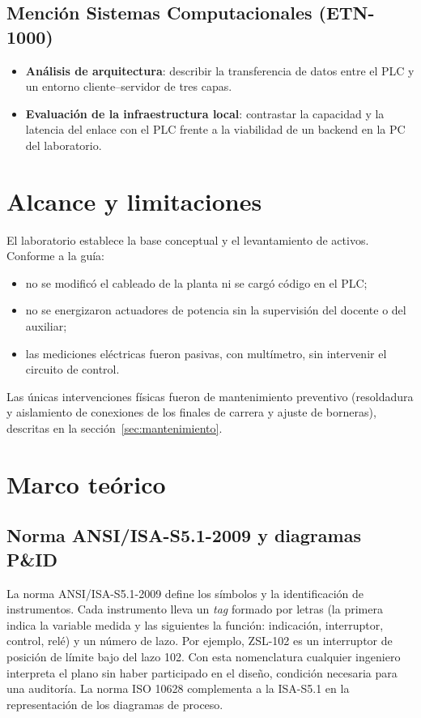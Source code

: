\documentclass[a4paper,11pt]{article}
\begin{document}
\subsection{Mención Sistemas Computacionales (ETN-1000)}
\begin{itemize}
\item \textbf{Análisis de arquitectura}: describir la transferencia de datos entre el PLC y un entorno cliente--servidor de tres capas.
\item \textbf{Evaluación de la infraestructura local}: contrastar la capacidad y la latencia del enlace con el PLC frente a la viabilidad de un backend en la PC del laboratorio.
\end{itemize}

\section{Alcance y limitaciones}
El laboratorio establece la base conceptual y el levantamiento de activos. Conforme a la guía:
\begin{itemize}
\item no se modificó el cableado de la planta ni se cargó código en el PLC;
\item no se energizaron actuadores de potencia sin la supervisión del docente o del auxiliar;
\item las mediciones eléctricas fueron pasivas, con multímetro, sin intervenir el circuito de control.
\end{itemize}
Las únicas intervenciones físicas fueron de mantenimiento preventivo (resoldadura y aislamiento de conexiones de los finales de carrera y ajuste de borneras), descritas en la sección~\ref{sec:mantenimiento}.

\section{Marco teórico}
\subsection{Norma ANSI/ISA-S5.1-2009 y diagramas P\&ID}
La norma ANSI/ISA-S5.1-2009 define los símbolos y la identificación de instrumentos. Cada instrumento lleva un \emph{tag} formado por letras (la primera indica la variable medida y las siguientes la función: indicación, interruptor, control, relé) y un número de lazo. Por ejemplo, ZSL-102 es un interruptor de posición de límite bajo del lazo 102. Con esta nomenclatura cualquier ingeniero interpreta el plano sin haber participado en el diseño, condición necesaria para una auditoría. La norma ISO 10628 complementa a la ISA-S5.1 en la representación de los diagramas de proceso.
\end{document}

